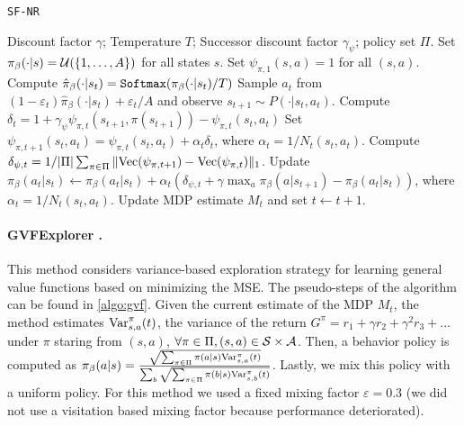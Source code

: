 \begin{algorithm}[h]
	\caption{{\tt SF-NR}}
	\label{algo:sfnr}
    \small
	\begin{algorithmic}[1]
    \REQUIRE Discount factor $\gamma$; Temperature $T$; Successor discount factor $\gamma_\psi$; policy set $\Pi$.
    \STATE Set $\pi_\beta(\cdot|s)={\cal U}(\{1,\dots,A\})$ for all states $s$.
    \STATE Set $\psi_{\pi,1}(s,a)=1$ for all $(s,a)$.
            \STATE Compute $\hat \pi_\beta(\cdot|s_t) = {\tt Softmax}(\pi_\beta(\cdot|s_t)/T)$
            \STATE Sample $a_t$ from $(1-\varepsilon_t)\hat \pi_\beta(\cdot|s_t)  +\varepsilon_t/A$ and observe $s_{t+1}\sim P(\cdot|s_t,a_t)$.
            \FOR{$\pi \in \Pi$}
                \STATE Compute $\delta_t=1+\gamma_\psi \psi_{\pi,t}(s_{t+1},\pi(s_{t+1}))-\psi_{\pi,t}(s_t,a_t)$
                \STATE Set $\psi_{\pi,t+1}(s_t,a_t)= \psi_{\pi,t}(s_t,a_t) + \alpha_t \delta_t$, where $\alpha_t=1/N_t(s_t,a_t)$.
            \ENDFOR
            \STATE Compute $\delta_{\psi,t}=1/|\Pi| \sum_{\pi\in \Pi}\|{\rm Vec}(\psi_{\pi,t+1})- {\rm Vec}(\psi_{\pi,t})\|_1$.
            \STATE Update $\pi_\beta(a_t|s_t)\gets \pi_\beta(a_t|s_t)+ \alpha_t\left(\delta_{\psi,t}+ \gamma \max_a\pi_\beta(a|s_{t+1}) - \pi_\beta(a_t|s_t)\right)$, where $\alpha_t=1/N_t(s_t,a_t)$.
            \STATE Update MDP estimate $M_t$ and set $t\gets t+1$.
            \ENDWHILE{}
	\end{algorithmic}
\end{algorithm}



\paragraph{GVFExplorer \cite{jain2024adaptive}.}  This method considers variance-based exploration strategy for learning general value functions \cite{sutton2011horde} based on minimizing the MSE. 
 The pseudo-steps of the algorithm can be found in \cref{algo:gvf}. 
Given the current estimate of the MDP $M_t$, the method estimates ${\rm Var}_{s,a}^\pi(t)$, the variance of the return $G^\pi=r_1+\gamma r_2+\gamma^2 r_3+\dots$ under $\pi$ staring from $(s,a)$, $\forall\pi\in \Pi, (s,a)\in {\cal S}\times{\cal A}$. Then, a behavior policy is computed as $
\pi_\beta(a|s) = \frac{\sqrt{\sum_{\pi\in\Pi} \pi(a|s)  {\rm Var}_{s,a}^\pi(t)}}{\sum_b\sqrt{\sum_{\pi\in\Pi} \pi(b|s)  {\rm Var}_{s,b}^\pi(t)}}$. Lastly, we mix this policy with a uniform policy. For this method we used a fixed mixing factor $\varepsilon=0.3$ (we did not use a visitation based mixing factor because performance deteriorated).





